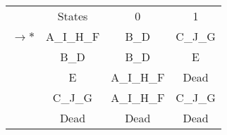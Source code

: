 \begin{tabular}[c]{r|c|c|c|} \cline{2-4}
    & States & 0 & 1 \\ \cline{2-4}
    $\rightarrow *$ & A\_I\_H\_F & B\_D & C\_J\_G \\ \cline{2-4}
    & B\_D & B\_D & E \\ \cline{2-4}
    & E & A\_I\_H\_F & Dead \\ \cline{2-4}
    & C\_J\_G & A\_I\_H\_F & C\_J\_G \\ \cline{2-4}
    & Dead & Dead & Dead \\ \cline{2-4}

\end{tabular}
